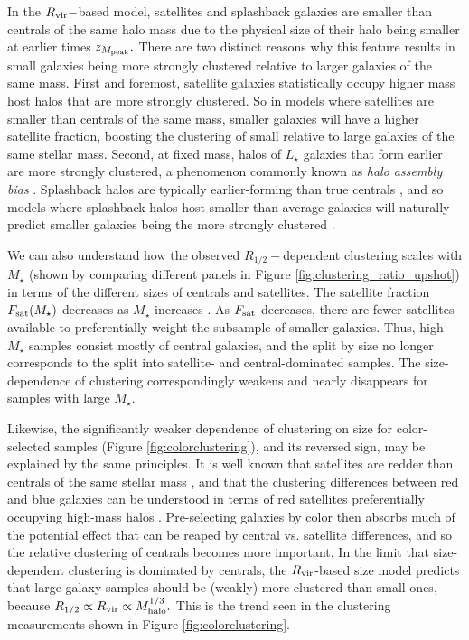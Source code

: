 \documentclass[usenatbib,usegraphicx,letterpaper]{mn2e}
\newcommand{\rhalf}{R_{1/2}}
\newcommand{\mstar}{M_{\star}}
\newcommand{\zpeak}{z_{M_{\rm peak}}}
\newcommand{\mhalo}{M_{\rm halo}}
\newcommand{\rvir}{R_{\rm vir}}
\begin{document}
In the $\rvir-$based model, satellites and splashback galaxies are smaller than centrals of the same halo mass due to the physical size of their halo being smaller at earlier times $\zpeak.$ There are two distinct reasons why this feature results in small galaxies being more strongly clustered relative to larger galaxies of the same mass. First and foremost, satellite galaxies statistically occupy higher mass host halos that are more strongly clustered. So in models where satellites are smaller than centrals of the same mass, smaller galaxies will have a higher satellite fraction, boosting the clustering of small relative to large galaxies of the same stellar mass. Second, at fixed mass, halos of $L_\star$ galaxies that form earlier are more strongly clustered, a phenomenon commonly known as {\em halo assembly bias} \citep{gao_white05,wechsler_etal06}. Splashback halos are typically earlier-forming than true centrals \citep{wang_etal09}, and so models where splashback halos host smaller-than-average galaxies will naturally predict smaller galaxies being the more strongly clustered \citep[see, e.g.,][for a demonstration of the splashback-dependence of halo clustering]{sunayama_etal16}.

We can also understand how the observed $\rhalf-$dependent clustering scales with $\mstar$ (shown by comparing different panels in Figure \ref{fig:clustering_ratio_upshot}) in terms of the different sizes of centrals and satellites. The satellite fraction $F_{\rm sat}(\mstar)$ decreases as $\mstar$ increases \citep[e.g.,][]{guo_etal11,reddick_etal13}. As $F_{\rm sat}$ decreases, there are fewer satellites available to preferentially weight the subsample of smaller galaxies. Thus,  high-$\mstar$ samples consist mostly of central galaxies, and the split by size no longer corresponds to the split into satellite- and central-dominated samples. The size-dependence of clustering correspondingly weakens and nearly disappears for samples with large $\mstar$.

Likewise, the significantly weaker dependence of clustering on size for color-selected samples (Figure \ref{fig:colorclustering}), and its reversed sign, may be explained by the same principles.  It is well known that satellites are redder than centrals of the same stellar mass \citep[e.g.,][]{vdB_etal08}, and that the clustering differences between red and blue galaxies can be understood in terms of red satellites preferentially occupying high-mass halos \citep[e.g.,][]{zehavi_etal11}. Pre-selecting galaxies by color then absorbs much of the potential effect that can be reaped by central vs. satellite differences, and so the relative clustering of centrals becomes more important. In the limit that size-dependent clustering is dominated by centrals, the $\rvir$-based size model predicts that large galaxy samples should be (weakly) more clustered than small ones, because $\rhalf\propto\rvir\propto\mhalo^{1/3}.$ This is the trend seen in the clustering measurements shown in Figure \ref{fig:colorclustering}.
\end{document}
